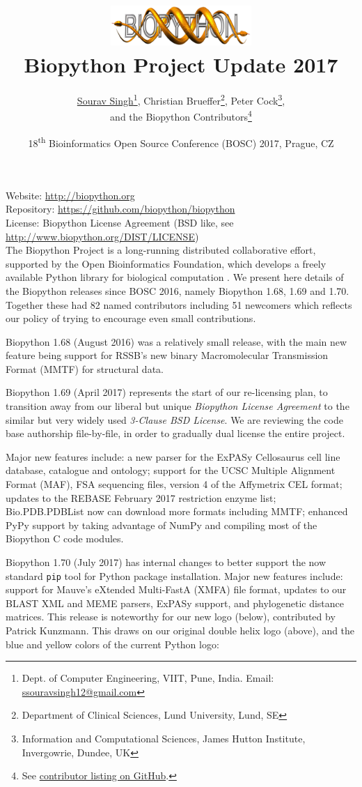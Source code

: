 \documentclass[10pt,oneside]{article}
\title{%
\vspace{-1.5in}
\includegraphics[width=0.4\textwidth]{../presentation/figures/biopython.jpg} \\
\vspace{3mm}Biopython Project Update 2017}
\author{
	\underline{Sourav Singh}\thanks{Dept. of Computer Engineering, VIIT, Pune, India. Email: \href{mailto:ssouravsingh12@gmail.com}{ssouravsingh12@gmail.com}},
    Christian Brueffer\thanks{Department of Clinical Sciences, Lund University, Lund, SE},
    Peter Cock\thanks{Information and Computational Sciences, James Hutton Institute, Invergowrie, Dundee, UK},\\
    and the Biopython Contributors\thanks{See \href{https://github.com/biopython/biopython/blob/master/CONTRIB.rst}{contributor listing on GitHub}.}}
\date{18\textsuperscript{th} Bioinformatics Open Source Conference (BOSC) 2017, Prague, CZ}
\begin{document}
\maketitle
\thispagestyle{empty}

\vspace{-0.2in}
\noindent
Website: \url{http://biopython.org} \\
Repository: \url{https://github.com/biopython/biopython} \\
License: Biopython License Agreement (BSD like, see \url{http://www.biopython.org/DIST/LICENSE}) \\

The Biopython Project is a long-running distributed collaborative effort,
supported by the Open Bioinformatics Foundation, which develops a freely
available Python library for biological computation \cite{AppNote}.
We present here details of the Biopython releases since BOSC 2016,
namely Biopython 1.68, 1.69 and 1.70. Together these had 82 named
contributors including 51 newcomers which reflects our policy of
trying to encourage even small contributions.

Biopython 1.68 (August 2016) was a relatively small release,
with the main new feature being support for RSSB's new binary
Macromolecular Transmission Format (MMTF) for structural data.

Biopython 1.69 (April 2017) represents the start of our re-licensing plan, to transition away
from our liberal but unique \emph{Biopython License Agreement} to the similar
but very widely used \emph{3-Clause BSD License}. We are reviewing the code
base authorship file-by-file, in order to gradually dual license the entire
project.

Major new features include: a new parser for the ExPASy Cellosaurus cell line
database, catalogue and ontology; support for the UCSC Multiple Alignment Format (MAF),
FSA sequencing files, version 4 of the Affymetrix CEL format; updates to the
REBASE February 2017 restriction enzyme list;
Bio.PDB.PDBList now can download more formats including MMTF;
enhanced PyPy support by taking advantage of NumPy and compiling most of the Biopython C code modules.

Biopython 1.70 (July 2017) has internal changes to better support the
now standard \verb|pip| tool for Python package installation.
Major new features include:
support for Mauve's eXtended Multi-FastA (XMFA) file format,
updates to our BLAST XML and MEME parsers, ExPASy support,
and phylogenetic distance matrices.
This release is noteworthy for our new logo (below),
contributed by Patrick Kunzmann. This draws on our original double helix logo
(above), and the blue and yellow colors of the current Python logo:
\end{document}
